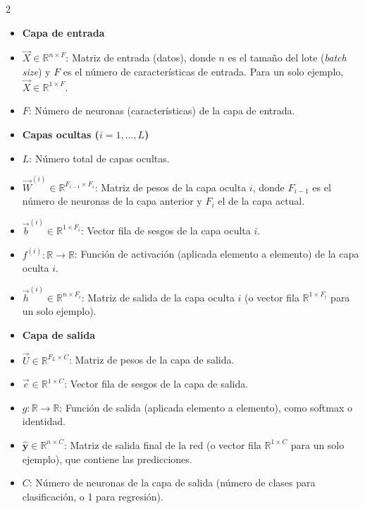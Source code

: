 \begin{multicols}{2}
\begin{itemize}
    \item[] \textbf{Capa de entrada}
    \item $\vec{X} \in \mathbb{R}^{n \times F}$: Matriz de entrada (datos), donde $n$ es el tamaño del lote (\emph{batch size}) y $F$ es el número de características de entrada. Para un solo ejemplo, $\vec{X} \in \mathbb{R}^{1 \times F}$.
    \item $F$: Número de neuronas (características) de la capa de entrada.
    
    \item[] \textbf{Capas ocultas ($i=1,\dots,L$)}
    \item $L$: Número total de capas ocultas.
    \item $\vec{W}^{(i)} \in \mathbb{R}^{F_{i-1} \times F_i}$: Matriz de pesos de la capa oculta $i$, donde $F_{i-1}$ es el número de neuronas de la capa anterior y $F_i$ el de la capa actual.
    \item $\vec{b}^{(i)} \in \mathbb{R}^{1 \times F_i}$: Vector fila de sesgos de la capa oculta $i$.
    \item $f^{(i)}: \mathbb{R} \to \mathbb{R}$: Función de activación (aplicada elemento a elemento) de la capa oculta $i$.
    \item $\vec{h}^{(i)} \in \mathbb{R}^{n \times F_i}$: Matriz de salida de la capa oculta $i$ (o vector fila $\mathbb{R}^{1 \times F_i}$ para un solo ejemplo).
    
    \item[] \textbf{Capa de salida}
    \item $\vec{U} \in \mathbb{R}^{F_L \times C}$: Matriz de pesos de la capa de salida.
    \item $\vec{c} \in \mathbb{R}^{1 \times C}$: Vector fila de sesgos de la capa de salida.
    \item $g: \mathbb{R} \to \mathbb{R}$: Función de salida (aplicada elemento a elemento), como softmax o identidad.
    \item $\hat{\mathbf{y}} \in \mathbb{R}^{n \times C}$: Matriz de salida final de la red (o vector fila $\mathbb{R}^{1 \times C}$ para un solo ejemplo), que contiene las predicciones.
    \item $C$: Número de neuronas de la capa de salida (número de clases para clasificación, o 1 para regresión).
\end{itemize}
\end{multicols}

